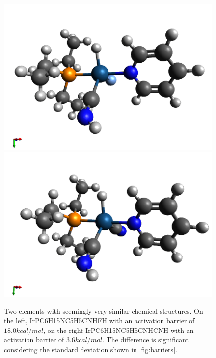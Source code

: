 \begin{figure}[!htb]
  \includegraphics[width=1.0\textwidth]{figures/introduction/ir_tbp_1_dft-pet3_1_dft-py_1_dft-hicn_1_fluoride_1_smi1_1_s_1.png}
  \endminipage\hfill
  \includegraphics[width=1.0\textwidth]{figures/introduction/ir_tbp_1_dft-pet3_1_dft-py_1_dft-hicn_1_dft-cn_1_smi1_1_s_1.png}
  \endminipage
  \caption{Two elements with seemingly very similar chemical structures. On the left, IrPC6H15NC5H5CNHFH with an activation barrier of $18.0 kcal/mol$, on the right IrPC6H15NC5H5CNHCNH with an activation barrier of $3.6 kcal/mol$.
  The difference is significant considering the standard deviation shown in \ref{fig:barriers}.  }
  \label{fig:struct-diff}
\end{figure}


